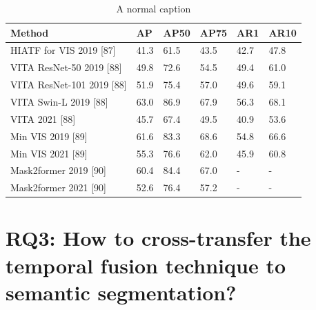 	\begin{table}[h]
   		\begin{center}
   			\begin{tabular}{ | l | l| l| l| l| p{2cm} |}
   				\hline
   				
   				\cellcolor{purple!30}Method & \cellcolor{purple!30}AP & \cellcolor{purple!30}AP50 & \cellcolor{purple!30}AP75 & \cellcolor{purple!30}AR1 & \cellcolor{purple!30}AR10 \\ \hline
   				HIATF for VIS 2019 [87] & 41.3 & 61.5 & 43.5 & 42.7 & 47.8 \\ \hline
   				VITA ResNet-50 2019 [88]  & 49.8 & 72.6 & 54.5 & 49.4 & 61.0  \\ \hline
   				VITA ResNet-101 2019 [88]  & 51.9 & 75.4 & 57.0 & 49.6 & 59.1 \\ \hline
   				VITA Swin-L 2019 [88]  & 63.0 & 86.9 & 67.9 & 56.3 & 68.1 \\ \hline
   				VITA 2021 [88]  & 45.7 & 67.4 & 49.5 & 40.9 & 53.6 \\ \hline
   				Min VIS 2019 [89] & 61.6 & 83.3 & 68.6 & 54.8 & 66.6 \\ \hline
   				Min VIS 2021 [89] & 55.3 & 76.6 & 62.0 & 45.9 & 60.8 \\ \hline
   				Mask2former 2019 [90]  & 60.4 & 84.4 & 67.0 & - & - \\ \hline
   				Mask2former 2021 [90]  & 52.6 & 76.4 & 57.2 & - & - \\ \hline
   				\hline
   			\end{tabular}
   			\caption{A normal caption}
   			\label{tab:sota_ytube_vis}
   		\end{center}
   	\end{table}
    
    \section{RQ3: How to cross-transfer the temporal fusion technique to semantic segmentation?}
    
